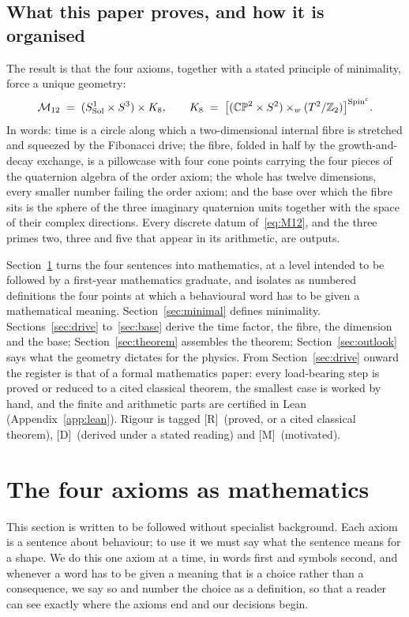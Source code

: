 \documentclass[11pt,a4paper]{article}
\theoremstyle{plain}
\theoremstyle{definition}
\theoremstyle{remark}
\newcommand{\Sol}{\mathrm{Sol}}
\newcommand{\rigR}{[\textup{R}]}
\newcommand{\rigD}{[\textup{D}]}
\newcommand{\rigM}{[\textup{M}]}
\begin{document}
\subsection{What this paper proves, and how it is organised}\label{sec:results}

The result is that the four axioms, together with a stated principle of minimality, force a unique geometry:
\begin{equation}\label{eq:M12}
\Mtwelve \;=\; (S^{1}_{\Sol}\times S^{3})\times\Keight, \qquad
\Keight \;=\; \bigl[(\CPtwo\times\Stwo)\times_{w}(\Ttwo/\Ztwo)\bigr]^{\Spinc}.
\end{equation}
In words: time is a circle along which a two-dimensional internal fibre is stretched and squeezed by the Fibonacci drive; the fibre, folded in half by the growth-and-decay exchange, is a pillowcase with four cone points carrying the four pieces of the quaternion algebra of the order axiom; the whole has twelve dimensions, every smaller number failing the order axiom; and the base over which the fibre sits is the sphere of the three imaginary quaternion units together with the space of their complex directions. Every discrete datum of~\eqref{eq:M12}, and the three primes two, three and five that appear in its arithmetic, are outputs.

Section~\ref{sec:axioms} turns the four sentences into mathematics, at a level intended to be followed by a first-year mathematics graduate, and isolates as numbered definitions the four points at which a behavioural word has to be given a mathematical meaning. Section~\ref{sec:minimal} defines minimality. Sections~\ref{sec:drive} to~\ref{sec:base} derive the time factor, the fibre, the dimension and the base; Section~\ref{sec:theorem} assembles the theorem; Section~\ref{sec:outlook} says what the geometry dictates for the physics. From Section~\ref{sec:drive} onward the register is that of a formal mathematics paper: every load-bearing step is proved or reduced to a cited classical theorem, the smallest case is worked by hand, and the finite and arithmetic parts are certified in Lean (Appendix~\ref{app:lean}). Rigour is tagged \rigR\ (proved, or a cited classical theorem), \rigD\ (derived under a stated reading) and \rigM\ (motivated).

\section{The four axioms as mathematics}\label{sec:axioms}

This section is written to be followed without specialist background. Each axiom is a sentence about behaviour; to use it we must say what the sentence means for a shape. We do this one axiom at a time, in words first and symbols second, and whenever a word has to be given a meaning that is a choice rather than a consequence, we say so and number the choice as a definition, so that a reader can see exactly where the axioms end and our decisions begin.
\end{document}
